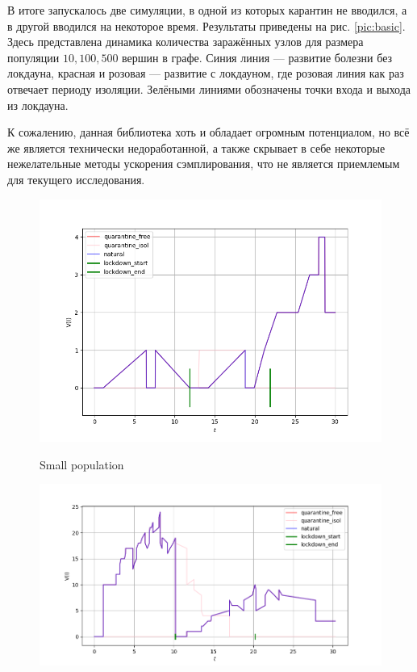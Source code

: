 	В итоге запускалось две симуляции, в одной из которых карантин не вводился, а в другой вводился на некоторое время. Результаты приведены на рис. \ref{pic:basic}. Здесь представлена динамика количества заражённых узлов для размера популяции $ 10, 100, 500 $ вершин в графе. Синия линия --- развитие болезни без локдауна, красная и розовая --- развитие с локдауном, где розовая линия как раз отвечает периоду изоляции. Зелёными линиями обозначены точки входа и выхода из локдауна.
	
	К сожалению, данная библиотека хоть и обладает огромным потенциалом, но всё же является технически недоработанной, а также скрывает в себе некоторые нежелательные методы ускорения сэмплирования, что не является приемлемым для текущего исследования. 
	
	\begin{figure}[h]
		\begin{minipage}{0.49\linewidth}
			\includegraphics[width=\linewidth, keepaspectratio]{../figs/basic_experiment_small_population}
			
			\centering
			Small population
		\end{minipage}
		\begin{minipage}{0.49\linewidth}
			\includegraphics[width=\linewidth, keepaspectratio]{../figs/basic_experiment_medium_population}
			

\end{minipage}
\end{figure}

